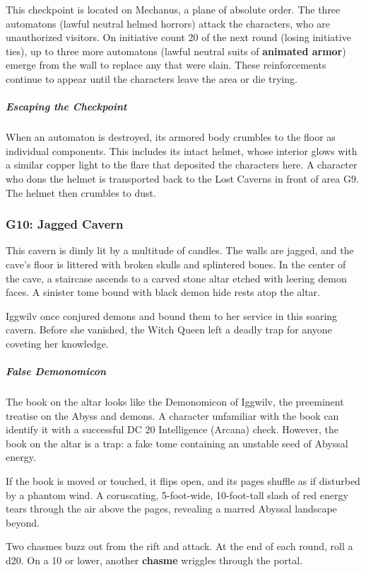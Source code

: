 \documentclass[10pt,a4paper,twoside,bg=print,twocolumn,openany,nodeprecatedcode]{dndbook}
\begin{document}
This checkpoint is located on Mechanus, a plane of absolute order. The three automatons (lawful neutral helmed horrors) attack the characters, who are unauthorized visitors. On initiative count 20 of the next round (losing initiative ties), up to three more automatons (lawful neutral suits of \textbf{animated armor}) emerge from the wall to replace any that were slain. These reinforcements continue to appear until the characters leave the area or die trying.

\subparagraph{Escaping the Checkpoint}
When an automaton is destroyed, its armored body crumbles to the floor as individual components. This includes its intact helmet, whose interior glows with a similar copper light to the flare that deposited the characters here. A character who dons the helmet is transported back to the Lost Caverns in front of area G9. The helmet then crumbles to dust.

\subsubsection{G10: Jagged Cavern}
\begin{DndReadAloud}{}
This cavern is dimly lit by a multitude of candles. The walls are jagged, and the cave's floor is littered with broken skulls and splintered bones. In the center of the cave, a staircase ascends to a carved stone altar etched with leering demon faces. A sinister tome bound with black demon hide rests atop the altar.

\end{DndReadAloud}

Iggwilv once conjured demons and bound them to her service in this soaring cavern. Before she vanished, the Witch Queen left a deadly trap for anyone coveting her knowledge.

\subparagraph{False Demonomicon}
The book on the altar looks like the Demonomicon of Iggwilv, the preeminent treatise on the Abyss and demons. A character unfamiliar with the book can identify it with a successful DC 20 Intelligence (Arcana) check. However, the book on the altar is a trap: a fake tome containing an unstable seed of Abyssal energy.

If the book is moved or touched, it flips open, and its pages shuffle as if disturbed by a phantom wind. A coruscating, 5-foot-wide, 10-foot-tall slash of red energy tears through the air above the pages, revealing a marred Abyssal landscape beyond.

Two chasmes buzz out from the rift and attack. At the end of each round, roll a d20. On a 10 or lower, another \textbf{chasme} wriggles through the portal.
\end{document}
